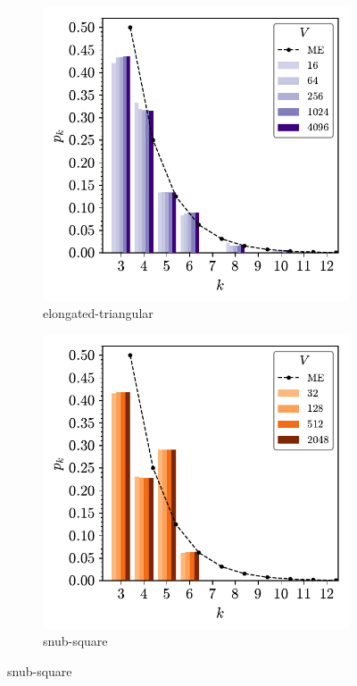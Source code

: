 \begin{figure}[bt]
     \centering
     
     \begin{subfigure}[b]{0.40\textwidth}
         \centering
         \includegraphics[width=\textwidth]{./figures/procrystals/elong4_pk.pdf}
         \caption{elongated\--triangular}
         \label{fig:pro45pka}
     \end{subfigure}
     \hspace{1cm}
     \begin{subfigure}[b]{0.40\textwidth}
         \centering
         \includegraphics[width=\textwidth]{./figures/procrystals/snub4_pk.pdf}
         \caption{snub\--square}
         \label{fig:pro45pkb}
     \end{subfigure}
     

\end{figure}
